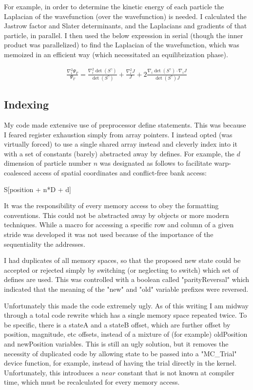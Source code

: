 \documentclass[11pt, conference, compsocconf]{IEEEtran}
\begin{document}
For example, in order to determine the kinetic energy of each particle the Laplacian of the wavefunction (over the wavefunction) is needed. I calculated the Jastrow factor and Slater determinants, and the Laplacians and gradients of that particle, in parallel. I then used the below expression in serial (though the inner product was parallelized) to find the Laplacian of the wavefunction, which was memoized in an efficient way (which necessitated an equilibrization phase).

\begin{align}\frac{\nabla_i^2 \Psi_T}{\Psi_T} = \frac{\nabla_i^2 \det\left(S^\gamma \right)}{\det\left(S^\gamma \right)} + \frac{\nabla_i^2 J}{J} + 2\frac{\nabla_i \det\left(S^\gamma \right) \cdot \nabla_i J}{\det\left(S^\gamma \right) J}\end{align}

\subsection{Indexing}
My code made extensive use of preprocessor define statements. This was because I feared register exhaustion simply from array pointers. I instead opted (was virtually forced) to use a single shared array instead and cleverly index into it with a set of constants (barely) abstracted away by defines. For example, the $d$ dimension of particle number $n$ was designated as follows to facilitate warp-coalesced access of spatial coordinates and conflict-free bank access: 

S[position + n*D + d] 

It was the responsibility of every memory access to obey the formatting conventions. This could not be abstracted away by objects or more modern techniques. While a macro for accessing a specific row and column of a given stride was developed it was not used because of the importance of the sequentiality the addresses. 

I had duplicates of all memory spaces, so that the proposed new state could be accepted or rejected simply by switching (or neglecting to switch) which set of defines are used. This was controlled with a boolean called "parityReversal" which indicated that the meaning of the "new" and "old" variable prefixes were reversed. 

Unfortunately this made the code extremely ugly. As of this writing I am midway through a total code rewrite which has a single memory space repeated twice. To be specific, there is a stateA and a stateB offset, which are further offset by position, magnitude, etc offsets, instead of a mixture of (for example) oldPosition and newPosition variables. This is still an ugly solution, but it removes the necessity of duplicated code by allowing state to be passed into a "MC\_Trial" device function, for example, instead of having the trial directly in the kernel. Unfortunately, this introduces a $near$ constant that is not known at compiler time, which must be recalculated for every memory access. 
\end{document}
